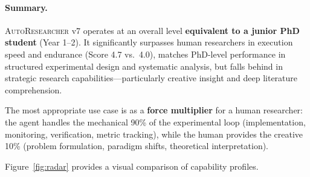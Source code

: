 \documentclass[11pt,a4paper]{article}
\newcommand{\sysname}{\textsc{AutoResearcher}}
\begin{document}
\paragraph{Summary.}
\sysname{} v7 operates at an overall level \textbf{equivalent to a junior PhD student} (Year 1--2).
It significantly surpasses human researchers in execution speed and endurance (Score 4.7 vs.\ 4.0), matches PhD-level performance in structured experimental design and systematic analysis, but falls behind in strategic research capabilities---particularly creative insight and deep literature comprehension.

The most appropriate use case is as a \textbf{force multiplier} for a human researcher: the agent handles the mechanical 90\% of the experimental loop (implementation, monitoring, verification, metric tracking), while the human provides the creative 10\% (problem formulation, paradigm shifts, theoretical interpretation).

Figure~\ref{fig:radar} provides a visual comparison of capability profiles.
\end{document}
